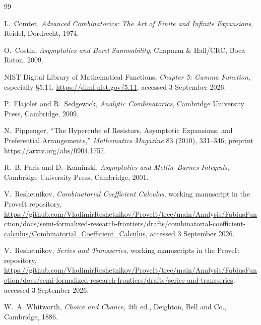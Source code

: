 \documentclass[11pt,oneside]{article}
\numberwithin{equation}{section}
\begin{document}
\begin{thebibliography}{99}

L.~Comtet,
\emph{Advanced Combinatorics: The Art of Finite and Infinite Expansions},
Reidel, Dordrecht, 1974.

O.~Costin,
\emph{Asymptotics and Borel Summability},
Chapman \& Hall/CRC, Boca Raton, 2009.

NIST Digital Library of Mathematical Functions,
\emph{Chapter 5: Gamma Function}, especially \S5.11,
\url{https://dlmf.nist.gov/5.11}, accessed 3 September 2026.

P.~Flajolet and R.~Sedgewick,
\emph{Analytic Combinatorics},
Cambridge University Press, Cambridge, 2009.

N.~Pippenger,
``The Hypercube of Resistors, Asymptotic Expansions, and Preferential Arrangements,''
\emph{Mathematics Magazine} 83 (2010), 331--346;
preprint \url{https://arxiv.org/abs/0904.1757}.

R.~B. Paris and D.~Kaminski,
\emph{Asymptotics and Mellin--Barnes Integrals},
Cambridge University Press, Cambridge, 2001.

V.~Reshetnikov,
\emph{Combinatorial Coefficient Calculus}, working manuscript in the ProveIt repository,
\url{https://github.com/VladimirReshetnikov/ProveIt/tree/main/Analysis/FabiusFunction/docs/semi-formalized-research-frontiers/drafts/combinatorial-coefficient-calculus/Combinatorial_Coefficient_Calculus},
accessed 3 September 2026.

V.~Reshetnikov,
\emph{Series and Transseries}, working manuscripts in the ProveIt repository,
\url{https://github.com/VladimirReshetnikov/ProveIt/tree/main/Analysis/FabiusFunction/docs/semi-formalized-research-frontiers/drafts/series-and-transseries},
accessed 3 September 2026.

W.~A. Whitworth,
\emph{Choice and Chance}, 4th ed.,
Deighton, Bell and Co., Cambridge, 1886.

\end{thebibliography}
\end{document}
